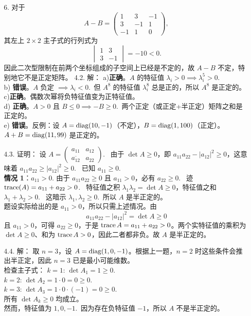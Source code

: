 \begin{exer}
6. 对于
$$A-B=\begin{pmatrix}1&3&-1\\3&-1&1\\-1&1&0\end{pmatrix},$$
其左上 $2\times2$ 主子式的行列式为
$$\begin{vmatrix}1&3\\3&-1\end{vmatrix}=-10<0.$$
因此二次型限制在前两个坐标组成的子空间上已经是不定的，故 $A-B$ 不定，特别地它不是正定矩阵。
4.2. 解： a)\textbf{正确}。$A$ 的特征值 $\lambda_i > 0 \implies \lambda_i^5 > 0$.~
\\
b) \textbf{错误}。$A$ 负定 $\implies \lambda_i < 0$.~但 $A^8$ 的特征值 $\lambda_i^8$ 总是正的，所以 $A^8$ 是正定的。
\\
c)\textbf{正确}。偶数次幂将负特征值变为正特征值。
\\
d) \textbf{正确}。$A > 0$ 且 $B \le 0 \implies -B \ge 0$.~两个正定（或正定+半正定）矩阵之和是正定的。
\\
e) \textbf{错误}。反例：设 $A = \operatorname{diag}(10, -1)$（不定），$B = \operatorname{diag}(1, 100)$（正定）。$A+B = \operatorname{diag}(11, 99)$ 是正定的。

4.3. 证明：
设 $A = \begin{pmatrix} a_{11} & a_{12} \\ \overline{a_{12}} & a_{22} \end{pmatrix}$.~
由于 $\det A \ge 0$，即 $a_{11}a_{22} - |a_{12}|^2 \ge 0$，这意味着 $a_{11}a_{22} \ge |a_{12}|^2 \ge 0$.~
已知 $a_{11} \ge 0$.~\\
\textbf{情况 1}：$a_{11} > 0$.
由于 $a_{11}a_{22} \ge 0$ 且 $a_{11} > 0$，必有 $a_{22} \ge 0$.~
迹 $\operatorname{trace}(A) = a_{11} + a_{22} > 0$.~
特征值之积 $\lambda_1 \lambda_2 = \det A \ge 0$，特征值之和 $\lambda_1 + \lambda_2 > 0$.~
这暗示 $\lambda_1, \lambda_2 \ge 0$.~所以 $A$ 是半正定的。
\\
题设实际给出的是 $a_{11}>0$，所以只需上述情况。由
$$a_{11}a_{22}-|a_{12}|^2=\det A\ge0$$
且 $a_{11}>0$，可得 $a_{22}\ge0$，于是 $\operatorname{trace} A=a_{11}+a_{22}>0$。两个实特征值的乘积为 $\det A\ge0$、和为 $\operatorname{trace} A>0$，因此二者都非负。故 $A$ 是半正定的。

4.4. 解：
取 $n=3$，设 $A = \operatorname{diag}(1, 0, -1)$。根据上一题，$n=2$ 时这些条件会推出半正定，因此 $n=3$ 已是最小可能维数。\\
检查主子式：
$k=1$: $\det A_1 = 1 \ge 0$.\\
$k=2$: $\det A_2 = 1 \cdot 0 = 0 \ge 0$.\\
$k=3$: $\det A_3 = 1 \cdot 0 \cdot (-1) = 0 \ge 0$.\\
所有 $\det A_k \ge 0$ 均成立。\\
然而，特征值为 $1, 0, -1$.~因为存在负特征值 $-1$，所以 $A$ 不是半正定的。


\end{exer}
